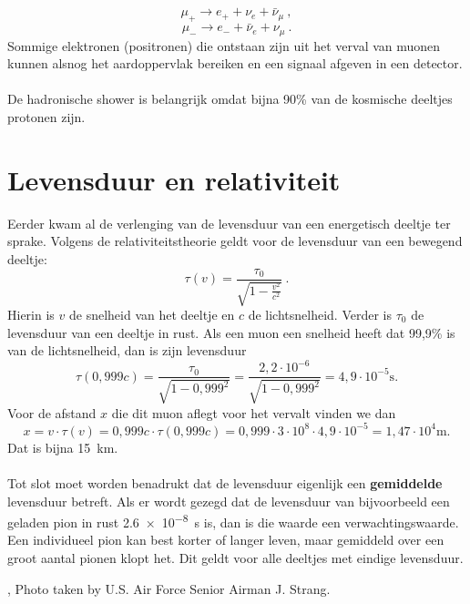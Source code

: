 \begin{equation}
\mu_{+} \rightarrow e_{+} + \nu_e + \bar{\nu}_\mu \ , \nonumber
\end{equation}
\begin{equation}
\mu_{-} \rightarrow e_{-} + \bar{\nu}_e + \nu_\mu \ . \nonumber
\end{equation}  
Sommige elektronen (positronen) die ontstaan zijn uit het verval van muonen kunnen alsnog het aardoppervlak bereiken en een signaal afgeven in een \hisparc detector.
\\ \\
De hadronische shower is belangrijk omdat bijna 90\% van de kosmische deeltjes protonen zijn.
 

\section{Levensduur en relativiteit}
Eerder kwam al de verlenging van de levensduur van een energetisch deeltje ter sprake. Volgens de relativiteitstheorie geldt voor de levensduur van een bewegend deeltje:
\begin{equation}
\tau (v) = \frac{\tau_0}{\sqrt{1-\frac{v^2}{c^2}}} \ . \nonumber
\end{equation}
Hierin is $v$ de snelheid van het deeltje en $c$ de lichtsnelheid. Verder is $\tau_0$ de levensduur van een deeltje in rust. Als een muon een snelheid heeft dat 99,9\% is van de lichtsnelheid, dan is zijn levensduur 
\begin{equation}
\tau(0,999c)=\frac{\tau_0}{\sqrt{1-0,999^2}}=\frac{2,2 \cdot 10^{-6}}{\sqrt{1-0,999^2}}=4,9 \cdot 10^{-5} \textrm{s}. \nonumber
\end{equation}
Voor de afstand $x$ die dit muon aflegt voor het vervalt vinden we dan 
\begin{equation}
x = v \cdot \tau (v)= 0,999c \cdot \tau (0,999c) = 0,999 \cdot 3 \cdot 10^8 \cdot 4,9 \cdot 10^{-5}=1,47 \cdot 10^4 \textrm{m}. \nonumber
\end{equation}
Dat is bijna \SI{15}{\km}. 
\\ \\
Tot slot moet worden benadrukt dat de levensduur eigenlijk een \textbf{gemiddelde} levensduur betreft. Als er wordt gezegd dat de levensduur van bijvoorbeeld een geladen pion in rust \SI{2,6e-8}{\s} is, dan is die waarde een verwachtingswaarde. Een individueel pion kan best korter of langer leven, maar gemiddeld over een groot aantal pionen klopt het. Dit geldt voor alle deeltjes met eindige levensduur.


\begin{thebibliography}{9}
, Photo taken by U.S. Air Force Senior Airman J. Strang.

\end{thebibliography}








